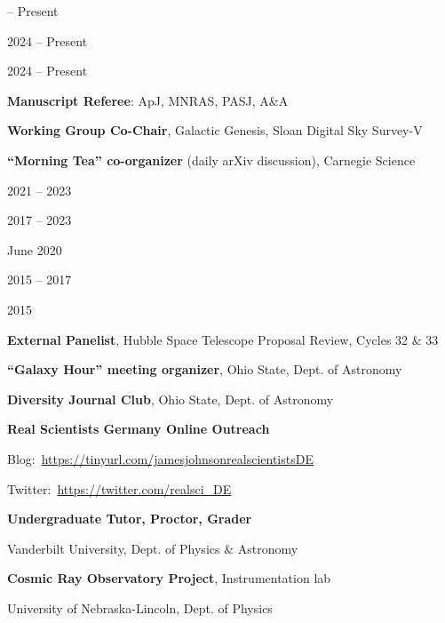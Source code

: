 \documentclass[cv.tex]{subfiles}
\begin{document}
\parbox{0.18\textwidth}{%
	 -- Present \par
	2024 -- Present \par
	2024 -- Present \par
}
\hspace{1mm}
\parbox{0.8\textwidth}{%
	\vspace{1mm}
	\textbf{Manuscript Referee}: ApJ, MNRAS, PASJ, A\&A \par
	\textbf{Working Group Co-Chair}, Galactic Genesis, Sloan Digital Sky Survey-V
	\par
	\textbf{``Morning Tea'' co-organizer} (daily arXiv discussion), Carnegie
	Science \par
}

\newpage
\noindent
\parbox{0.18\textwidth}{%
	 \par
	2021 -- 2023 \par
	2017 -- 2023 \par
	June 2020 \par
	\null \par
	\null \par
	2015 -- 2017 \par
	\null \par
	2015 \par
	\null \par
}
\hspace{1mm}
\parbox{0.8\textwidth}{%
	\textbf{External Panelist}, Hubble Space Telescope Proposal Review, Cycles 32 \& 33
	\par
	\textbf{``Galaxy Hour'' meeting organizer}, Ohio State, Dept. of Astronomy
	\par
	\textbf{Diversity Journal Club}, Ohio State, Dept. of Astronomy \par
	\textbf{Real Scientists Germany Online Outreach} \par
	Blog:~\url{https://tinyurl.com/jamesjohnsonrealscientistsDE} \par
	Twitter:~\url{https://twitter.com/realsci_DE} \par
	\textbf{Undergraduate Tutor, Proctor, Grader} \par
	Vanderbilt University, Dept. of Physics \& Astronomy \par
	\textbf{Cosmic Ray Observatory Project}, Instrumentation lab \par
	University of Nebraska-Lincoln, Dept. of Physics \par
}
\end{document}

